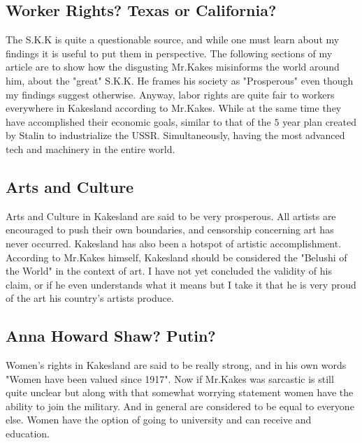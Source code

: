 \documentclass[fleqn]{article}
\newcommand{\3}{\vspace*{3mm}}
\newcommand{\Kakes}{S.K.K \hspace*{.15mm}}
\begin{document}
\subsection*{Worker Rights? Texas or California? }

\3

The \Kakes is quite a questionable source, and while one must learn about my findings it is useful to put them in perspective. The following sections of my article are to show how the disgusting Mr.Kakes misinforms the world around him, about the "great" S.K.K. He frames his society as "Prosperous" even though my findings suggest otherwise. Anyway, labor rights are quite fair to workers everywhere in Kakesland according to Mr.Kakes. While at the same time they have accomplished their economic goals, similar to that of the $5$ year plan created by Stalin to industrialize the USSR. Simultaneously, having the most advanced tech and machinery in the entire world. 


\3

\subsection*{Arts and Culture}

\3

Arts and Culture in Kakesland are said to be very prosperous. All artists are encouraged to push their own boundaries, and censorship concerning art has never occurred. Kakesland has also been a hotspot of artistic accomplishment. According to Mr.Kakes himself, Kakesland should be considered the "Belushi of the World" in the context of art. I have not yet concluded the validity of his claim, or if he even understands what it means but I take it that he is very proud of the art his country's artists produce. 

\3

\subsection*{Anna Howard Shaw? Putin?}

\3

Women's rights in Kakesland are said to be really strong, and in his own words "Women have been valued since 1917". Now if Mr.Kakes was sarcastic is still quite unclear but along with that somewhat worrying statement women have the ability to join the military. And in general are considered to be equal to everyone else. Women have the option of going to university and can receive and education. 
\end{document}
